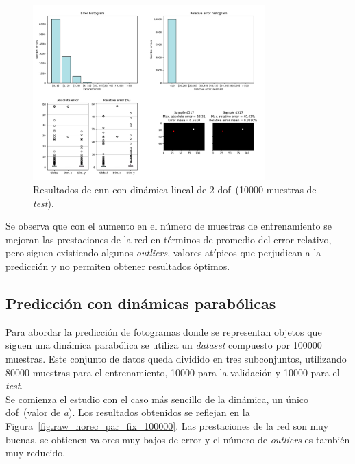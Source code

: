 \begin{figure}[H]
		\begin{center}
			\includegraphics[width=0.8\textwidth]{ figures/test_raw/NOREC/linear_var_100000.png}
			\caption{Resultados de \acrshort{cnn} con dinámica lineal de 2 \acrshort{dof}~(10000 muestras de \textit{test}).}
			\label{fig.raw_norec_lin_var_100000}
		\end{center}
\end{figure}
\vspace{-10pt}

Se observa que con el aumento en el número de muestras de entrenamiento se mejoran las prestaciones de la red en términos de promedio del error relativo, pero siguen existiendo algunos \textit{outliers}, valores atípicos que perjudican a la predicción y no permiten obtener resultados óptimos.

\subsection{Predicción con dinámicas parabólicas}
Para abordar la predicción de fotogramas donde se representan objetos que siguen una dinámica parabólica se utiliza un \textit{dataset} compuesto por 100000 muestras. Este conjunto de datos queda dividido en tres subconjuntos, utilizando 80000 muestras para el entrenamiento, 10000 para la validación y 10000 para el \textit{test}.\\

Se comienza el estudio con el caso más sencillo de la dinámica, un único \acrshort{dof}~(valor de \textit{a}). Los resultados obtenidos se reflejan en la Figura~\ref{fig.raw_norec_par_fix_100000}. Las prestaciones de la red son muy buenas, se obtienen valores muy bajos de error y el número de \textit{outliers} es también muy reducido.

